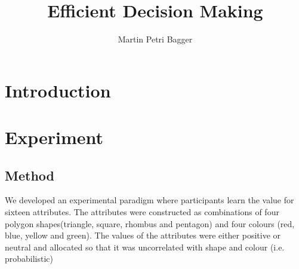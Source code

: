 \documentclass[12pt,a4paper]{article}
\author{Martin Petri Bagger}
\title{Efficient Decision Making}
\begin{document}
\section*{Introduction}

\section*{Experiment}

\subsection*{Method}
We developed an experimental paradigm where participants learn the value for sixteen attributes. The attributes were constructed as combinations of four polygon shapes(triangle, square, rhombus and pentagon) and four colours (red, blue, yellow and green). The values of the attributes were either positive or neutral and allocated so that it was uncorrelated with shape and colour (i.e. probabilistic)
\end{document}
